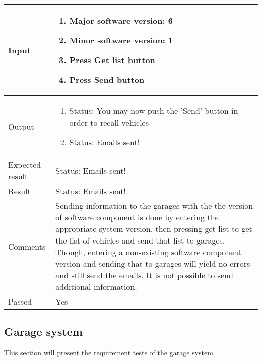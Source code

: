 \begin{table}[H]
\begin{tabularx}{1.0\textwidth}{
    |p{}     %
    |p{}|    %
}
Input
& \begin{enumerate}
    \item Major software version: 6
    \item Minor software version: 1
    \item Press Get list button
    \item Press Send button
\end{enumerate}
\\
\hline

Output
& \begin{enumerate}
    \item Status: You may now push the 'Send' button in order to recall vehicles
    \item Status: Emails sent!
\end{enumerate}
\\
\hline

Expected result
& Status: Emails sent!
\\
\hline

Result
& Status: Emails sent!
\\
\hline

Comments
& Sending information to the garages with the the version of software component is done by entering the appropriate system version, then pressing get list to get the list of vehicles and send that list to garages. Though, entering a non-existing software component version and sending that to garages will yield no errors and still send the emails. It is not possible to send additional information.
\\
\hline

Passed
& Yes
\\
\hline


\end{tabularx}
\end{table}


\clearpage

\subsection{Garage system}

This section will present the requirement tests of the garage system.



